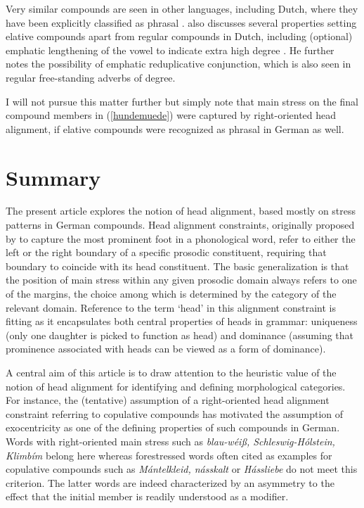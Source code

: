 \documentclass[output=paper
 ,nobabel
 ,draftmode
 ,colorlinks, citecolor=brown
]{langscibook}
\begin{document}
\noindent
Very similar compounds are seen in other languages, including Dutch, where they have been explicitly
classified as phrasal \citep[157--158]{TrommelenZonneveld1986}. \citet{Hoeksema2012} also discusses
several properties setting elative compounds apart from regular compounds in Dutch, including
(optional) emphatic lengthening of the vowel to indicate extra high degree
\citep[98]{Hoeksema2012}. He further notes the possibility of emphatic reduplicative conjunction,
which is also seen in regular free-standing adverbs of degree.  

I will not pursue this matter further but simply note that main stress on the final compound members in (\ref{hundemuede}) were captured by right-oriented head alignment, if elative compounds were recognized as phrasal in German as well. 

\section{Summary}\label{sec-conclu-rf}

The present article explores the notion of head alignment, based mostly on stress patterns in German compounds. Head alignment constraints, originally proposed by \citet{McCarthyPrince1993} to capture the most prominent foot in a phonological word, refer to either the left or the right boundary of a specific prosodic constituent, requiring that boundary to coincide with its head constituent. The basic generalization is that the position of main stress within any given prosodic domain always refers to one of the margins, the choice among which is determined by the category of the relevant domain. Reference to the term `head' in this alignment constraint is fitting as it encapsulates both central properties of heads in grammar: uniqueness (only one daughter is picked to function as head) and dominance (assuming that prominence associated with heads can be viewed as a form of dominance).
 
A central aim of this article is to draw attention to the heuristic value of the notion of head alignment for identifying and defining morphological categories. For instance, the (tentative) assumption of a right-oriented head alignment constraint referring to copulative compounds has motivated the assumption of exocentricity as one of the defining properties of such compounds in German. Words with right-oriented main stress such as \emph{blau-wéiß, Schleswig-Hólstein, Klimbím} belong here whereas forestressed words often cited as examples for copulative compounds such as \emph{Mántelkleid, násskalt} or \emph{Hássliebe} do not meet this criterion. The latter words are indeed characterized by an asymmetry to the effect that the initial member is readily understood as a modifier. 
\end{document}
